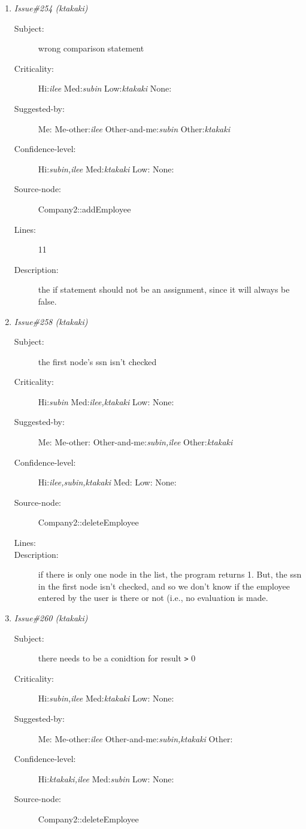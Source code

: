 \begin{enumerate}
\begin{description}
\item [Description:] in the if statement, if current==0 and
result{\tt <}0, then we will go to the else conidtion.  But, what is returned is
wrong, since the matching employee has not been found.
\end{description}
\item {\it Issue\#254 (ktakaki)}
\begin{description}
\item [Subject:] wrong comparison statement
\item [Criticality:] Hi:{\it ilee} Med:{\it subin} Low:{\it ktakaki} None:{\it }
\item [Suggested-by:] Me:{\it } Me-other:{\it ilee} Other-and-me:{\it subin} Other:{\it ktakaki}
\item [Confidence-level:] Hi:{\it subin,ilee} Med:{\it ktakaki} Low:{\it } None:{\it }
\item [Source-node:] Company2::addEmployee

\item [Lines:] 11

\item [Description:] the if statement should not be an assignment,
since it will always be false.
\end{description}
\item {\it Issue\#258 (ktakaki)}
\begin{description}
\item [Subject:] the first node's ssn isn't checked
\item [Criticality:] Hi:{\it subin} Med:{\it ilee,ktakaki} Low:{\it } None:{\it }
\item [Suggested-by:] Me:{\it } Me-other:{\it } Other-and-me:{\it subin,ilee} Other:{\it ktakaki}
\item [Confidence-level:] Hi:{\it ilee,subin,ktakaki} Med:{\it } Low:{\it } None:{\it }
\item [Source-node:] Company2::deleteEmployee

\item [Lines:] 

\item [Description:] if there is only one node in the list, the 
program returns 1.  But, the ssn in the first node isn't checked, and so we
don't know if the employee entered by the user is there or not (i.e., no
evaluation is made.
\end{description}
\item {\it Issue\#260 (ktakaki)}
\begin{description}
\item [Subject:] there needs to be a conidtion for result {\tt >} 0
\item [Criticality:] Hi:{\it subin,ilee} Med:{\it ktakaki} Low:{\it } None:{\it }
\item [Suggested-by:] Me:{\it } Me-other:{\it ilee} Other-and-me:{\it subin,ktakaki} Other:{\it }
\item [Confidence-level:] Hi:{\it ktakaki,ilee} Med:{\it subin} Low:{\it } None:{\it }
\item [Source-node:] Company2::deleteEmployee


\end{description}
\end{enumerate}
